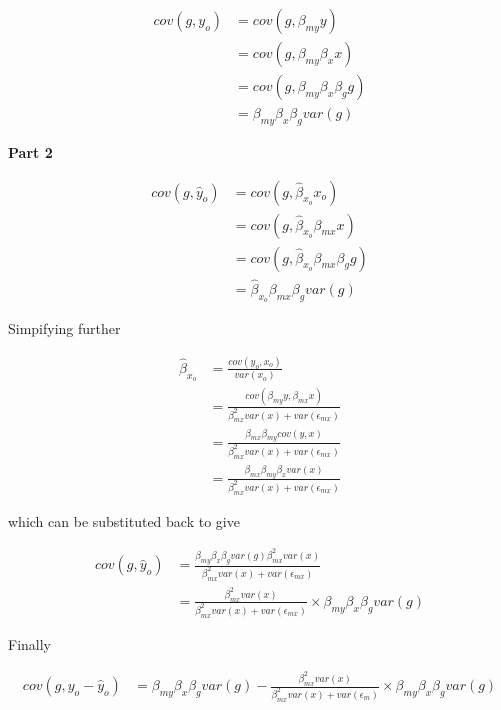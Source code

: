 \documentclass[]{article}
\begin{document}
\[
\begin{aligned}
cov(g, y_o) & = cov(g, \beta_{my} y) \\
            & = cov(g, \beta_{my} \beta_x x) \\
            & = cov(g, \beta_{my} \beta_x \beta_g g) \\
            & = \beta_{my} \beta_x \beta_g var(g)
\end{aligned}
\]

\textbf{Part 2}

\[
\begin{aligned}
cov(g, \hat{y}_o) & = cov(g, \hat{\beta}_{x_o} x_o) \\
                  & = cov(g, \hat{\beta}_{x_o} \beta_{mx} x) \\
                  & = cov(g, \hat{\beta}_{x_o} \beta_{mx} \beta_g g) \\
                  & = \hat{\beta}_{x_o} \beta_{mx} \beta_g var(g)
\end{aligned}
\]

Simpifying further

\[
\begin{aligned}
\hat{\beta}_{x_o} & = \frac{cov(y_o, x_o)} {var(x_o)} \\
                  & = \frac{cov(\beta_{my} y, \beta_{mx} x)} {\beta_{mx}^2 var(x) + var(\epsilon_{mx})} \\
                  & = \frac{\beta_{mx} \beta_{my} cov(y, x)} {\beta_{mx}^2 var(x) + var(\epsilon_{mx})} \\
                  & = \frac{\beta_{mx} \beta_{my} \beta_x var(x)} {\beta_{mx}^2 var(x) + var(\epsilon_{mx})}
\end{aligned}
\]

which can be substituted back to give

\[
\begin{aligned}
cov(g, \hat{y}_o) & = \frac{\beta_{my} \beta_x \beta_g var(g) \beta_{mx}^2 var(x)} {\beta_{mx}^2 var(x) + var(\epsilon_{mx})} \\
                  & = \frac{\beta_{mx}^2 var(x)} {\beta_{mx}^2 var(x) + var(\epsilon_{mx})} \times \beta_{my} \beta_x \beta_g var(g)
\end{aligned}
\]

Finally

\[
\begin{aligned}
cov(g, y_o - \hat{y}_o) & = \beta_{my} \beta_x \beta_g var(g) - \frac{\beta_{mx}^2 var(x)} {\beta_{mx}^2 var(x) + var(\epsilon_m)} \times \beta_{my} \beta_x \beta_g var(g)
\end{aligned}
\]
\end{document}
